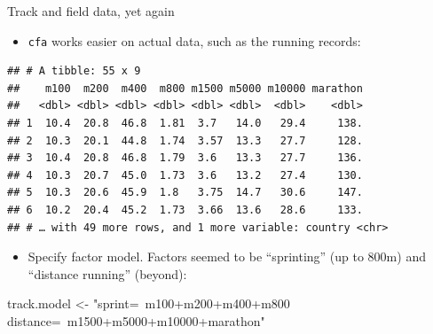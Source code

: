 \documentclass[ignorenonframetext,]{beamer}
\newenvironment{Shaded}{\begin{snugshade}}{\end{snugshade}}
\newcommand{\DataTypeTok}[1]{\textcolor[rgb]{0.13,0.29,0.53}{#1}}
\newcommand{\DecValTok}[1]{\textcolor[rgb]{0.00,0.00,0.81}{#1}}
\newcommand{\KeywordTok}[1]{\textcolor[rgb]{0.13,0.29,0.53}{\textbf{#1}}}
\newcommand{\NormalTok}[1]{#1}
\newcommand{\OperatorTok}[1]{\textcolor[rgb]{0.81,0.36,0.00}{\textbf{#1}}}
\newcommand{\StringTok}[1]{\textcolor[rgb]{0.31,0.60,0.02}{#1}}
\providecommand{\tightlist}{%
  \setlength{\itemsep}{0pt}\setlength{\parskip}{0pt}}
\begin{document}
\begin{frame}[fragile]{Track and field data, yet again}
\protect\hypertarget{track-and-field-data-yet-again}{}

\begin{itemize}
\tightlist
\item
  \texttt{cfa} works easier on actual data, such as the running records:
\end{itemize}

\footnotesize

\begin{Shaded}
\end{Shaded}

\begin{verbatim}
## # A tibble: 55 x 9
##    m100  m200  m400  m800 m1500 m5000 m10000 marathon
##   <dbl> <dbl> <dbl> <dbl> <dbl> <dbl>  <dbl>    <dbl>
## 1  10.4  20.8  46.8  1.81  3.7   14.0   29.4     138.
## 2  10.3  20.1  44.8  1.74  3.57  13.3   27.7     128.
## 3  10.4  20.8  46.8  1.79  3.6   13.3   27.7     136.
## 4  10.3  20.7  45.0  1.73  3.6   13.2   27.4     130.
## 5  10.3  20.6  45.9  1.8   3.75  14.7   30.6     147.
## 6  10.2  20.4  45.2  1.73  3.66  13.6   28.6     133.
## # … with 49 more rows, and 1 more variable: country <chr>
\end{verbatim}

\normalsize

\begin{itemize}
\tightlist
\item
  Specify factor model. Factors seemed to be ``sprinting'' (up to 800m)
  and ``distance running'' (beyond):
\end{itemize}

\footnotesize

\begin{Shaded}
\begin{Highlighting}[]
\NormalTok{track.model <-}\StringTok{ "sprint=~m100+m200+m400+m800}
\StringTok{                distance=~m1500+m5000+m10000+marathon"}
\end{Highlighting}
\end{Shaded}

\normalsize

\end{frame}
\end{document}
